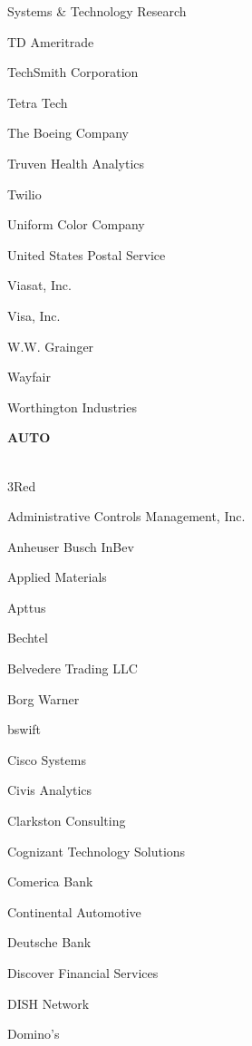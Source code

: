 \documentclass[twoside]{article}
\begin{document}
\begin{center}
\begin{multicols}{5}
\begin{FlushLeft}
\begin{compactitem}
\item Systems \& Technology Research
\item TD Ameritrade
\item TechSmith Corporation
\item Tetra Tech
\item The Boeing Company
\item Truven Health Analytics
\item Twilio
\item Uniform Color Company
\item United States Postal Service
\item Viasat, Inc.
\item Visa, Inc.
\item W.W. Grainger
\item Wayfair
\item Worthington Industries
\end{compactitem}
        \end{FlushLeft}
        \vspace{1em}
        {\fontsize{14}{16}\selectfont \bf AUTO}\\
        \vspace{-1em}
        ~\hrulefill~
        \vspace{-.9em}
        \begin{FlushLeft}
        \begin{compactitem}
        \item 3Red
\item Administrative Controls Management, Inc.
\item Anheuser Busch InBev
\item Applied Materials
\item Apttus
\item Bechtel
\item Belvedere Trading LLC
\item Borg Warner
\item bswift
\item Cisco Systems
\item Civis Analytics
\item Clarkston Consulting
\item Cognizant Technology Solutions
\item Comerica Bank
\item Continental Automotive
\item Deutsche Bank
\item Discover Financial Services
\item DISH Network
\item Domino's

\end{compactitem}
\end{FlushLeft}
\end{multicols}
\end{center}
\end{document}
